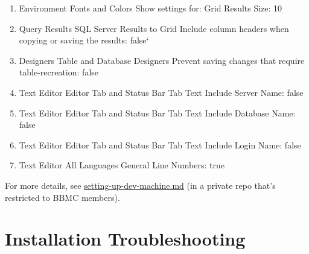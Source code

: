 \documentclass[
]{book}
\begin{document}
\begin{itemize}
  \begin{enumerate}
  \def\labelenumi{\arabic{enumi}.}
  \item
    Environment \textbar{} Fonts and Colors \textbar{} Show settings for: Grid Results \textbar{} Size: 10
  \item
    Query Results \textbar{} SQL Server \textbar{} Results to Grid \textbar{} Include column headers when copying or saving the results: false`
  \item
    Designers \textbar{} Table and Database Designers \textbar{} Prevent saving changes that require table-recreation: false
  \item
    Text Editor \textbar{} Editor Tab and Status Bar \textbar{} Tab Text \textbar{} Include Server Name: false
  \item
    Text Editor \textbar{} Editor Tab and Status Bar \textbar{} Tab Text \textbar{} Include Database Name: false
  \item
    Text Editor \textbar{} Editor Tab and Status Bar \textbar{} Tab Text \textbar{} Include Login Name: false
  \item
    Text Editor \textbar{} All Languages \textbar{} General \textbar{} Line Numbers: true
  \end{enumerate}

  For more details, see \href{https://github.com/OuhscBbmc/bbmc-database-management/blob/master/maintenance/setting-up-server/setting-up-dev-machine.md}{setting-up-dev-machine.md} (in a private repo that's restricted to BBMC members).
\end{itemize}

\hypertarget{installation-troubleshooting}{%
\section{Installation Troubleshooting}\label{installation-troubleshooting}}
\end{document}
